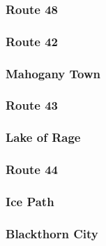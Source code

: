 \documentclass{article}%
\begin{document}
%
\subsubsection{Route 48}%
\label{ssubsec:Route48}%

%
%
%
\subsubsection{Route 42}%
\label{ssubsec:Route42}%

%
%
\subsubsection{Mahogany Town}%
\label{ssubsec:MahoganyTown}%

%
%
\subsubsection{Route 43}%
\label{ssubsec:Route43}%

%
%
\subsubsection{Lake of Rage}%
\label{ssubsec:LakeofRage}%

%
%
%
%
\subsubsection{Route 44}%
\label{ssubsec:Route44}%

%
%
%
%
%
\subsubsection{Ice Path}%
\label{ssubsec:IcePath}%

%
%
\subsubsection{Blackthorn City}%
\label{ssubsec:BlackthornCity}%
\end{document}
